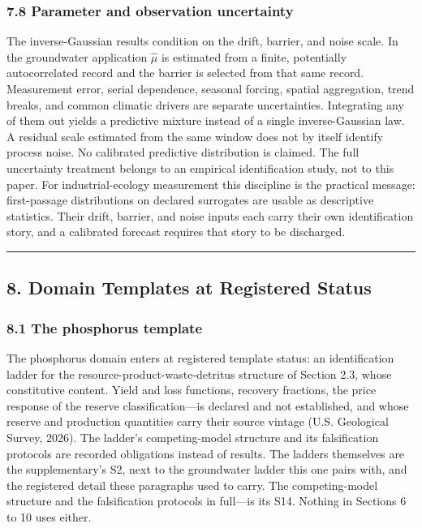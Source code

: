 \documentclass[11pt]{article}
\begin{document}
\subsubsection{7.8 Parameter and observation
uncertainty}\label{parameter-and-observation-uncertainty}

The inverse-Gaussian results condition on the drift, barrier, and noise scale. In the groundwater application \(\widehat\mu\) is estimated from a finite, potentially autocorrelated record and the barrier is selected from that same record. Measurement error, serial dependence, seasonal forcing, spatial aggregation, trend breaks, and common climatic drivers are separate uncertainties. Integrating any of them out yields a predictive mixture instead of a single inverse-Gaussian law. A residual scale estimated from the same window does not by itself identify process noise. No calibrated predictive distribution is claimed. The full uncertainty treatment belongs to an empirical identification study, not to this paper. For industrial-ecology measurement this discipline is the practical message: first-passage distributions on declared surrogates are usable as descriptive statistics. Their drift, barrier, and noise inputs each carry their own identification story, and a calibrated forecast requires that story to be discharged.

\begin{center}\rule{0.5\linewidth}{0.5pt}\end{center}

\subsection{8. Domain Templates at Registered
Status}\label{domain-templates-at-registered-status}

\subsubsection{8.1 The phosphorus
template}\label{the-phosphorus-template}

The phosphorus domain enters at registered template status: an identification ladder for the resource-product-waste-detritus structure of Section 2.3, whose constitutive content. Yield and loss functions, recovery fractions, the price response of the reserve classification---is declared and not established, and whose reserve and production quantities carry their source vintage (U.S. Geological Survey, 2026). The ladder's competing-model structure and its falsification protocols are recorded obligations instead of results. The ladders themselves are the supplementary's S2, next to the groundwater ladder this one pairs with, and the registered detail these paragraphs used to carry. The competing-model structure and the falsification protocols in full---is its S14. Nothing in Sections 6 to 10 uses either.
\end{document}

